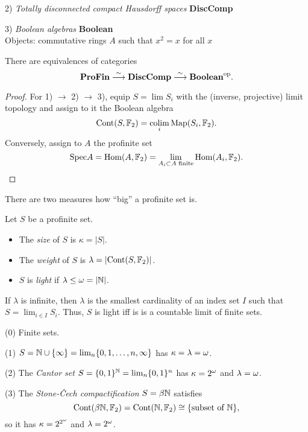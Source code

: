 \documentclass{notes}
\begin{document}
2) {\em Totally disconnected compact Hausdorff spaces} {\bf DiscComp}

3) {\em Boolean algebras} {\bf Boolean} \\ 
Objects: commutative rings $A$ such that $x^2=x$ for all $x$ 

\begin{prop}
There are equivalences of categories
$$
  \textbf{ProFin} \stackrel{\sim}\longrightarrow 
  \textbf{DiscComp} \stackrel{\sim}\longrightarrow  
  \textbf{Boolean}^{\rm op}.
$$
\end{prop}

\begin{proof}
For 1) $\to$ 2) $\to$ 3), equip $S=\lim S_i$ with the (inverse,
projective) limit topology and assign to it the Boolean algebra
$$
   {\rm Cont}(S,{\mathbb{F}}_2) = \operatorname*{colim}_i{\rm Map}(S_i,{\mathbb{F}}_2).
$$
Conversely, assign to $A$ the profinite set
$$
  {\rm Spec} A = \mathrm{Hom}(A,{\mathbb{F}}_2) = \lim_{A_i\subset A\text{ finite}}\mathrm{Hom}(A_i,{\mathbb{F}}_2).
$$
\end{proof}

There are two measures how ``big'' a profinite set is.

\begin{defi}
Let $S$ be a profinite set. 
\begin{itemize}
\item The {\em size} of $S$ is $\kappa=|S|$.
\item The {\em weight} of $S$ is $\lambda=|{\rm Cont}(S,{\mathbb{F}}_2)|$.
\item $S$ is {\em light} if $\lambda\leq{\omega}=|{\mathbb{N}}|$.
\end{itemize}
\end{defi}

\begin{rem}
If $\lambda$ is infinite, then $\lambda$ is the smallest
  cardinality of an index set $I$ such that $S=\lim_{i\in I}S_i$.
Thus, $S$ is light iff is is a countable limit of finite sets.
\end{rem}

\begin{example}
(0) Finite sets.
  
(1) $S = {\mathbb{N}}\cup\{\infty\} = \lim_n\{0,1,\dots,n,\infty\}$ has $\kappa=\lambda={\omega}$. 

(2) The {\em Cantor set} $S = \{0,1\}^{\mathbb{N}} = \lim_n\{0,1\}^n$ has
  $\kappa=2^{\omega}$ and $\lambda={\omega}$.

(3) The {\em Stone-\v{C}ech compactification} $S=\beta{\mathbb{N}}$ satisfies 
$$
  {\rm Cont}(\beta{\mathbb{N}},{\mathbb{F}}_2) = {\rm Cont}({\mathbb{N}},{\mathbb{F}}_2) \cong \{\text{subset of }{\mathbb{N}}\},
$$
so it has $\kappa=2^{2^{\omega}}$ and $\lambda=2^{\omega}$. 
\end{example}
\end{document}
